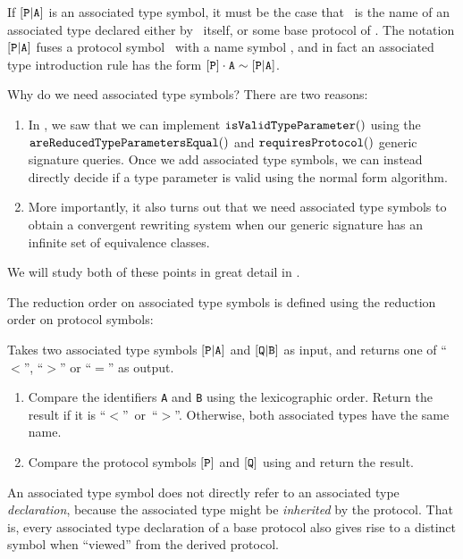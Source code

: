 \documentclass[../generics]{subfiles}
\begin{document}
If $[\texttt{P}|\texttt{A}]$ is an associated type symbol, it must be the case that \nA\ is the name of an associated type declared either by \tP\ itself, or some base protocol of \tP. The notation $[\texttt{P}|\texttt{A}]$ fuses a protocol symbol \pP\ with a name symbol \nA, and in fact an associated type introduction rule has the form $[\texttt{P}]\cdot\texttt{A}\sim[\texttt{P}|\texttt{A}]$.

Why do we need associated type symbols? There are two reasons:
\begin{enumerate}
\item In , we saw that we can implement $\texttt{isValidTypeParameter}()$ using the $\texttt{areReducedTypeParametersEqual}()$ and $\texttt{requiresProtocol}()$ generic signature queries. Once we add associated type symbols, we can instead directly decide if a type parameter is valid using the normal form algorithm.

\item More importantly, it also turns out that we need associated type symbols to obtain a convergent rewriting system when our generic signature has an infinite set of equivalence classes.
\end{enumerate}
We will study both of these points in great detail in .

The reduction order on associated type symbols is defined using the reduction order on protocol symbols:
\begin{algorithm}\label{associated type reduction order} Takes two associated type symbols $[\texttt{P}|\texttt{A}]$ and $[\texttt{Q}|\texttt{B}]$ as input, and returns one of ``$<$'', ``$>$'' or ``$=$'' as output.
\begin{enumerate}
\item Compare the identifiers \texttt{A} and \texttt{B} using the lexicographic order. Return the result if it is ``$<$''~or~``$>$''. Otherwise, both associated types have the same name.
\item Compare the protocol symbols $[\texttt{P}]$ and $[\texttt{Q}]$ using  and return the result.
\end{enumerate}
\end{algorithm}

An associated type symbol does not directly refer to an associated type \emph{declaration}, because the associated type might be \emph{inherited} by the protocol. That is, every associated type declaration of a base protocol also gives rise to a distinct symbol when ``viewed'' from the derived protocol.
\end{document}
